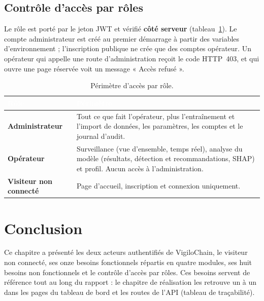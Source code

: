 \subsection{Contrôle d'accès par rôles}
\label{sec:rbac}

Le rôle est porté par le jeton JWT et vérifié \textbf{côté serveur}
(tableau~\ref{tab:rbac}). Le compte administrateur est créé au premier
démarrage à partir des variables d'environnement ; l'inscription publique ne
crée que des comptes opérateur. Un opérateur qui appelle une route
d'administration reçoit le code HTTP~403, et qui ouvre une page réservée voit un
message « Accès refusé ».

\begin{table}[H]
\centering
\small
\renewcommand{\arraystretch}{1.4}
\setlength{\arrayrulewidth}{0.8pt}
\caption{Périmètre d'accès par rôle.}
\label{tab:rbac}
\begin{tabularx}{\textwidth}{@{}>{\bfseries}p{3.4cm} >{\raggedright\arraybackslash}X@{}}
\rowcolor{thead}
\textcolor{white}{\textbf{Rôle}} & \textcolor{white}{\textbf{Périmètre}} \\
\hline
Administrateur & Tout ce que fait l'opérateur, plus l'entraînement et
l'import de données, les paramètres, les comptes et le journal d'audit. \\
\rowcolor{trowa}
Opérateur & Surveillance (vue d'ensemble, temps réel), analyse du modèle
(résultats, détection et recommandations, SHAP) et profil. Aucun accès à
l'administration. \\
Visiteur non connecté & Page d'accueil, inscription et connexion
uniquement. \\
\hline
\end{tabularx}
\end{table}

\section*{Conclusion}
Ce chapitre a présenté les deux acteurs authentifiés de VigiloChain, le
visiteur non connecté, ses onze besoins fonctionnels répartis en quatre
modules, ses huit besoins non fonctionnels et le contrôle d'accès par rôles.
Ces besoins servent de référence tout au long du rapport : le chapitre de
réalisation les retrouve un à un dans les pages du tableau de bord et les
routes de l'API (tableau de traçabilité).
